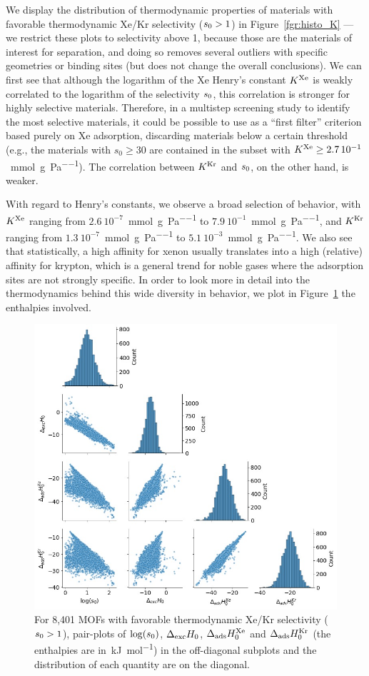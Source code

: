 \documentclass[main.tex]{subfiles}
\begin{document}
We display the distribution of thermodynamic properties of materials with favorable thermodynamic Xe/Kr selectivity ($s_{\text{0}} > 1$) in Figure~\ref{fgr:histo_K} --- we restrict these plots to selectivity above 1, because those are the materials of interest for separation, and doing so removes several outliers with specific geometries or binding sites (but does not change the overall conclusions). We can first see that although the logarithm of the Xe Henry's constant $K^{\text{Xe}}$ is weakly correlated to the logarithm of the selectivity $s_{\text{0}}$, this correlation is stronger for highly selective materials. Therefore, in a multistep screening study to identify the most selective materials, it could be possible to use as a ``first filter'' criterion based purely on Xe adsorption, discarding materials below a certain threshold (e.g., the materials with $s_0\ge30$ are contained in the subset with $K^{\text{Xe}}\ge2.7\,10^{-1}$~\si{\milli\mol\per\gram\per\pascal}). The correlation between $K^{\text{Kr}}$ and $s_{\text{0}}$, on the other hand, is weaker.

With regard to Henry's constants, we observe a broad selection of behavior, with $K^{\text{Xe}}$ ranging from $2.6\ 10^{-7}$~\si{\milli\mol\per\gram\per\pascal} to $7.9\ 10^{-1}$~\si{\milli\mol\per\gram\per\pascal}, and $K^{\text{Kr}}$ ranging from $1.3\ 10^{-7}$~\si{\milli\mol\per\gram\per\pascal} to $5.1\ 10^{-3}$~\si{\milli\mol\per\gram\per\pascal}. We also see that statistically, a high affinity for xenon usually translates into a high (relative) affinity for krypton, which is a general trend for noble gases where the adsorption sites are not strongly specific. In order to look more in detail into the thermodynamics behind this wide diversity in behavior, we plot in Figure~\ref{fgr:histo_H} the enthalpies involved.


\begin{figure}[t]
\centering
  \includegraphics[width=0.7\linewidth]{figures/2-thermo/Enthalpy_0_log.jpg}
  \caption{For 8,401 MOFs with favorable thermodynamic Xe/Kr selectivity ($s_{\text{0}} > 1$), pair-plots of $\log(s_{\text{0}})$, $\Delta_{\text{exc}}H_{\text{0}}$, $\Delta_{\text{ads}}H^{\text{Xe}}_{\text{0}}$ and $\Delta_{\text{ads}}H^{\text{Kr}}_{\text{0}}$ (the enthalpies are in~\si{\kilo\joule\per\mol}) in the off-diagonal subplots and the distribution of each quantity are on the diagonal.}
  \label{fgr:histo_H}
\end{figure}
\end{document}
